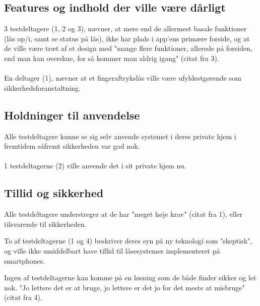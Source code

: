 \documentclass[a4paper,12pt]{article}
\begin{document}
\subsection{Features og indhold der ville være dårligt}
3 testdeltagere (1, 2 og 3), nævner, at mere end de allermest basale funktioner (lås op/i, samt se status på lås), ikke har plads i app'ens primære forside, og at de ville være træt af et design med "mange flere funktioner, allerede på forsiden, end man kan overskue, for så kommer man aldrig igang" (citat fra 3).
\\ \\
En deltager (1), nævner at et fingeraftrykslås ville være ufyldestgørende som sikkerhedsforanstaltning.

\subsection{Holdninger til anvendelse}
Alle testdeltagere kunne se sig selv anvende systemet i deres private hjem i fremtidem såfremt sikkerheden var god nok. 
\\ \\
1 testdeltagerne (2) ville anvende det i sit private hjem nu.

\subsection{Tillid og sikkerhed}

Alle testdeltagere understreger at de har "meget høje krav" (citat fra 1), eller tilsvarende til sikkerheden.

To af testdeltagerne (1 og 4) beskriver deres syn på ny teknologi som "skeptisk", og ville ikke umiddelbart have tillid til låsesystemer implementeret på smartphones.

Ingen af testdeltagerne kan komme på en løsning som de både finder sikker og let nok. "Jo lettere det er at bruge, jo lettere er det jo for det meste at misbruge" (citat fra 4).
\end{document}
